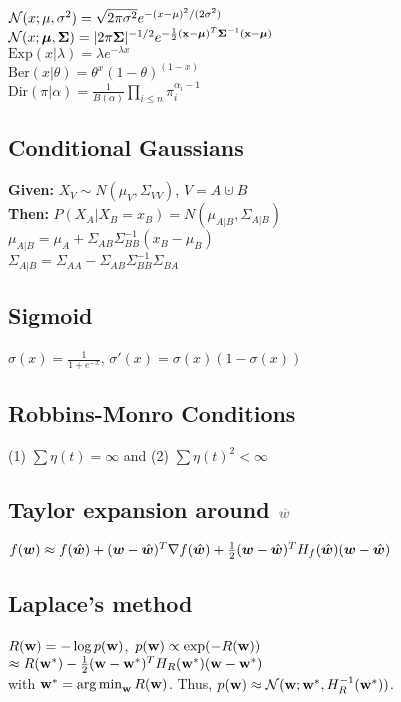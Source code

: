 $\mathcal{N}(x;\mu, \sigma^2)=\sqrt{2\pi\sigma^2}e^{-(x-\mu)^2/(2\sigma^2)}$\\
$\mathcal{N}(x;\bm{\mu}, \bm{\Sigma})= |2\pi\bm{\Sigma}|^{-1/2} e^{-\frac{1}{2}(\mathbf{x}-\bm{\mu})^T\bm{\Sigma}^{-1}(\mathbf{x}-\bm{\mu})} $\\
$\mathrm{Exp}(x|\lambda){=}\lambda e^{-\lambda x}$\\ $\mathrm{Ber}(x|\theta){=}\theta^x (1{-}\theta)^{(1-x)}$\\
$\mathrm{Dir}(\pi|\alpha) = \frac{1}{B(\alpha)}\prod_{i\leq n}\pi_i^{\alpha_i-1}$
\subsection*{Conditional Gaussians}
\textbf{Given:} $X_V \sim N(\mu_V, \Sigma_{VV})$, $V=A\cupdot B$\\
\textbf{Then:} $P(X_A|X_B=x_B)=N(\mu_{A|B}, \Sigma_{A|B})$\\
$\mu_{A|B}=\mu_A+\Sigma_{AB}\Sigma^{-1}_{BB}(x_B-\mu_B)$\\
$\Sigma_{A|B}=\Sigma_{AA}-\Sigma_{AB}\Sigma^{-1}_{BB}\Sigma_{BA}$

\subsection*{Sigmoid}
$\sigma(x)=\frac{1}{1+e^{-x}}$, $\sigma'(x)=\sigma(x)(1-\sigma(x))$

\subsection*{Robbins-Monro Conditions}
(1) $\sum\eta(t) = \infty$ and (2) $\sum\eta(t)^2 < \infty$

\subsection*{Taylor expansion {\color{gray} around $\color{gray}\hat\vw$}}
$f({\bm{w}}) \approx f(\hat{{\bm{w}}}) + ({\bm{w}} - \hat{{\bm{w}}})^T \nabla f(\hat{{\bm{w}}}) + \frac{1}{2}({\bm{w}}-\hat{{\bm{w}}})^TH_f(\hat{{\bm{w}}})({\bm{w}}-\hat{{\bm{w}}})$

\subsection*{Laplace's method}
\mbox{$R({\mathbf{w}}) = -\log p({\mathbf{w}})$, $p({\mathbf{w}}) \propto \exp(-R({\mathbf{w}}))$}\\ $\approx R({\mathbf{w}}^*) - \frac{1}{2}({\mathbf{w}}-{\mathbf{w}}^*)^TH_R({\mathbf{w}}^*)({\mathbf{w}}-{\mathbf{w}}^*)$\\ with ${\mathbf{w}}^* = \operatorname*{arg\,min}_{\mathbf{w}} R({\mathbf{w}})$. Thus, $p({\mathbf{w}}) \approx \mathcal{N}({\mathbf{w}};{\mathbf{w}}^*, H_R^{-1}({\mathbf{w}}^*))$.

